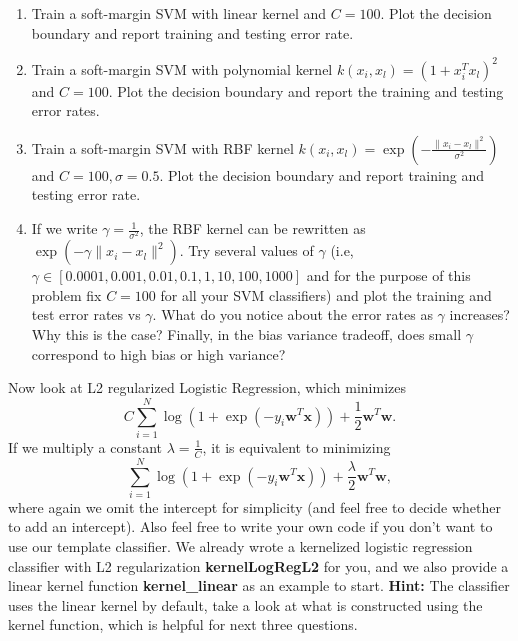 \documentclass{exam}
\begin{document}
\begin{enumerate}
    \item Train a soft-margin SVM with linear kernel and $C=100$. Plot the decision boundary and report training and testing error rate. 
    \item Train a soft-margin SVM with polynomial kernel $k(x_{i},x_{l}) = (1 + x_{i}^Tx_{l})^2$ and $C=100$. Plot the decision boundary and report the training and testing error rates. 
    \item Train a soft-margin SVM with RBF kernel $k(x_{i},x_{l}) = \exp(-\frac{\|x_i - x_l\|^2}{\sigma^2})$ and $C=100, \sigma=0.5$. Plot the decision boundary and report training and testing error rate. 
    \item If we write $\gamma  = \frac{1}{\sigma^2}$, the RBF kernel can be rewritten as $\exp(-\gamma \|x_i - x_l\|^2)$. Try several values of $\gamma$ (i.e, $\gamma \in [0.0001,0.001,0.01,0.1,1,10,100,1000]$ and for the purpose of this problem fix $C=100$ for all your SVM classifiers) and plot the training and test error rates vs $\gamma$. What do you notice about the error rates as $\gamma$ increases? Why this is the case? Finally, in the bias variance tradeoff, does small $\gamma$ correspond to high bias or high variance?
\end{enumerate}
Now look at L2 regularized Logistic Regression, which minimizes
\begin{equation}\label{eq:lr1}
    C\sum_{i=1}^N \log (1 + \exp (-y_i\bm{w}^T\bm{x})) + \frac{1}{2}\bm{w}^T\bm{w}.
\end{equation}
If we multiply a constant $\lambda = \frac{1}{C}$, it is equivalent to minimizing
\begin{equation}
    \sum_{i=1}^N \log (1 + \exp (-y_i\bm{w}^T\bm{x})) + \frac{\lambda}{2}\bm{w}^T\bm{w},
\end{equation}
where again we omit the intercept for simplicity (and feel free to decide whether to add an intercept). Also feel free to write your own code if you don't want to use our template classifier. We already wrote a kernelized logistic regression classifier with L2 regularization \textbf{kernelLogRegL2} for you, and we also provide a linear kernel function \textbf{kernel\_linear} as an example to start. \textbf{Hint:} The classifier uses the linear kernel by default, take a look at what is constructed using the kernel function, which is helpful for next three questions. 
\end{document}
